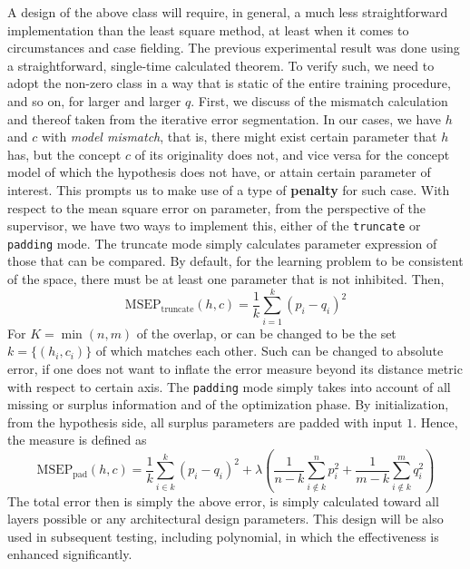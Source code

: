 \documentclass[10pt]{article} %
\begin{document}
A design of the above class will require, in general, a much less straightforward implementation than the least square method, at least when it comes to circumstances and case fielding. The previous experimental result was done using a straightforward, single-time calculated theorem. To verify such, we need to adopt the non-zero class in a way that is static of the entire training procedure, and so on, for larger and larger $q$. First, we discuss of the mismatch calculation and thereof taken from the iterative error segmentation. In our cases, we have $h$ and $c$ with \textit{model mismatch}, that is, there might exist certain parameter that $h$ has, but the concept $c$ of its originality does not, and vice versa for the concept model of which the hypothesis does not have, or attain certain parameter of interest. This prompts us to make use of a type of \textbf{penalty} for such case. With respect to the mean square error on parameter, from the perspective of the supervisor, we have two ways to implement this, either of the \texttt{truncate} or \texttt{padding} mode. The truncate mode simply calculates parameter expression of those that can be compared. By default, for the learning problem to be consistent of the space, there must be at least one parameter that is not inhibited. Then, 
\begin{equation}
    \mathrm{MSEP}_{\text{truncate}}(h,c) = \frac{1}{k} \sum^{k}_{i=1}(p_{i}-q_{i})^{2}
\end{equation}
For $K=\min(n,m)$ of the overlap, or can be changed to be the set $k=\{(h_{i},c_{i})\}$ of which matches each other. Such can be changed to absolute error, if one does not want to inflate the error measure beyond its distance metric with respect to certain axis. The \texttt{padding} mode simply takes into account of all missing or surplus information and of the optimization phase. By initialization, from the hypothesis side, all surplus parameters are padded with input $1$. Hence, the measure is defined as 
\begin{equation}\label{eq:parameter_penalty}
    \mathrm{MSEP}_{\text{pad}}(h,c) = \frac{1}{k} \sum^{k}_{i\in k} (p_{i}-q_{i})^{2} + \lambda \left(\frac{1}{n-k}\sum^{n}_{i\not\in k}p_{i}^{2}+ \frac{1}{m-k}\sum^{m}_{i\not\in k}q_{i}^{2}\right)
\end{equation}
The total error then is simply the above error, is simply calculated toward all layers possible or any architectural design parameters. This design will be also used in subsequent testing, including polynomial, in which the effectiveness is enhanced significantly. 
\end{document}
